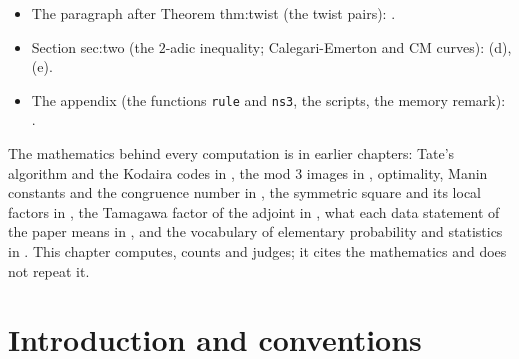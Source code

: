 \begin{sloppypar}
\begin{itemize}
; the calibration argument of Section sec:sharp is .
\item The paragraph after Theorem thm:twist (the twist pairs): .
\item Section sec:two (the $2$-adic inequality; Calegari-Emerton and CM curves): (d), (e).
\item The appendix (the functions \texttt{rule} and \texttt{ns3}, the scripts, the memory remark): .
\end{itemize}

The mathematics behind every computation is in earlier chapters: Tate's algorithm and the Kodaira codes in , the mod $3$ images in
, optimality, Manin constants and the congruence number in , the symmetric square and its local factors in
, the Tamagawa factor of the adjoint in , what each data statement of the paper means in ,
and the vocabulary of elementary probability and statistics in . This chapter computes, counts and judges; it cites the
mathematics and does not repeat it.

\section{Introduction and conventions}\label{sec:computation:intro}


\end{sloppypar}
